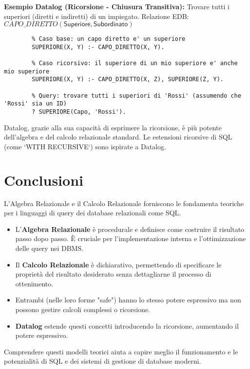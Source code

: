 \documentclass{article}
\newcommand{\Rel}[1]{\textit{#1}} %
\newcommand{\Attr}[1]{\textsf{#1}} %
\begin{document}
	\textbf{Esempio Datalog (Ricorsione - Chiusura Transitiva):} Trovare tutti i superiori (diretti e indiretti) di un impiegato.
	Relazione EDB: $\Rel{CAPO\_DIRETTO}(\Attr{Superiore}, \Attr{Subordinato})$
	\begin{verbatim}
		% Caso base: un capo diretto e' un superiore
		SUPERIORE(X, Y) :- CAPO_DIRETTO(X, Y).
		
		% Caso ricorsivo: il superiore di un mio superiore e' anche mio superiore
		SUPERIORE(X, Y) :- CAPO_DIRETTO(X, Z), SUPERIORE(Z, Y).
		
		% Query: trovare tutti i superiori di 'Rossi' (assumendo che 'Rossi' sia un ID)
		? SUPERIORE(Capo, 'Rossi').
	\end{verbatim}
	Datalog, grazie alla sua capacità di esprimere la ricorsione, è più potente dell'algebra e del calcolo relazionale standard. Le estensioni ricorsive di SQL (come `WITH RECURSIVE`) sono ispirate a Datalog.
	
	\section{Conclusioni}
	L'Algebra Relazionale e il Calcolo Relazionale forniscono le fondamenta teoriche per i linguaggi di query dei database relazionali come SQL.
	\begin{itemize}
		\item L'\textbf{Algebra Relazionale} è procedurale e definisce come costruire il risultato passo dopo passo. È cruciale per l'implementazione interna e l'ottimizzazione delle query nei DBMS.
		\item Il \textbf{Calcolo Relazionale} è dichiarativo, permettendo di specificare le proprietà del risultato desiderato senza dettagliarne il processo di ottenimento.
		\item Entrambi (nelle loro forme "safe") hanno lo stesso potere espressivo ma non possono gestire calcoli complessi o ricorsione.
		\item \textbf{Datalog} estende questi concetti introducendo la ricorsione, aumentando il potere espressivo.
	\end{itemize}
	Comprendere questi modelli teorici aiuta a capire meglio il funzionamento e le potenzialità di SQL e dei sistemi di gestione di database moderni.
	
\end{document}
